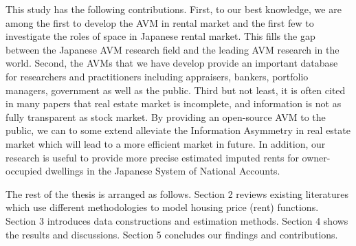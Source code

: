 \documentclass[a4paper, 12pt]{article} %
\begin{document}
This study has the following contributions. First, to our best knowledge, we are among the first to develop the AVM in rental market and the first few to investigate the roles of space in Japanese rental market. This fills the gap between the Japanese AVM research field and the leading AVM research in the world. Second, the AVMs that we have develop provide an important database for researchers and practitioners including appraisers, bankers, portfolio managers, government as well as the public. Third but not least, it is often cited in many papers \citep{cocco2000hedging} that real estate market is incomplete, and information is not as fully transparent as stock market. By providing an open-source AVM to the public, we can to some extend alleviate the Information Asymmetry in real estate market which will lead to a more efficient market in future. In addition, our research is useful to provide more precise estimated imputed rents for owner-occupied dwellings in the Japanese System of National Accounts.

The rest of the thesis is arranged as follows. Section 2 reviews existing literatures which use different methodologies to model housing price (rent) functions. Section 3 introduces data constructions and estimation methods. Section 4 shows the results and discussions. Section 5 concludes our findings and contributions. 
\end{document}
